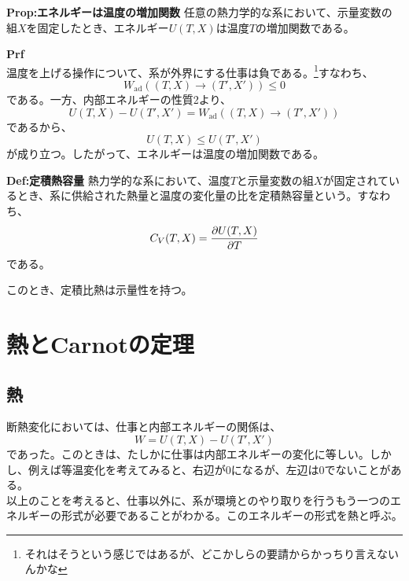 \documentclass[a4paper,11pt]{jsarticle}
\begin{document}
\begin{itembox}[l]{\textbf{Prop:エネルギーは温度の増加関数}}
    任意の熱力学的な系において、示量変数の組$X$を固定したとき、エネルギー$U(T,X)$は温度$T$の増加関数である。

\end{itembox}
\textbf{Prf}\\
温度を上げる操作について、系が外界にする仕事は負である。\footnote{それはそうという感じではあるが、どこかしらの要請からかっちり言えないんかな}すなわち、
\begin{equation}
    W_{\text{ad}}((T,X)\rightarrow (T',X')) \leq 0
\end{equation}
である。一方、内部エネルギーの性質2より、
\begin{equation}
    U(T,X) - U(T',X') = W_{\text{ad}}((T,X)\rightarrow (T',X'))
\end{equation}
であるから、
\begin{equation}
    U(T,X) \leq U(T',X')
\end{equation}
が成り立つ。したがって、エネルギーは温度の増加関数である。\\

\begin{itembox}[l]{\textbf{Def:定積熱容量}}
    熱力学的な系において、温度$T$と示量変数の組$X$が固定されているとき、系に供給された熱量と温度の変化量の比を定積熱容量という。すなわち、
    \begin{equation}
        C_V(T,X) = \pdv{U(T,X)}{T}
    \end{equation}
    である。

\end{itembox}
このとき、定積比熱は示量性を持つ。

\section{熱とCarnotの定理}
\subsection{熱}
断熱変化においては、仕事と内部エネルギーの関係は、
\begin{equation}
    W = U(T,X) - U(T',X')
\end{equation}
であった。このときは、たしかに仕事は内部エネルギーの変化に等しい。しかし、例えば等温変化を考えてみると、右辺が$0$になるが、左辺は$0$でないことがある。\\
以上のことを考えると、仕事以外に、系が環境とのやり取りを行うもう一つのエネルギーの形式が必要であることがわかる。このエネルギーの形式を熱と呼ぶ。\\
\end{document}
